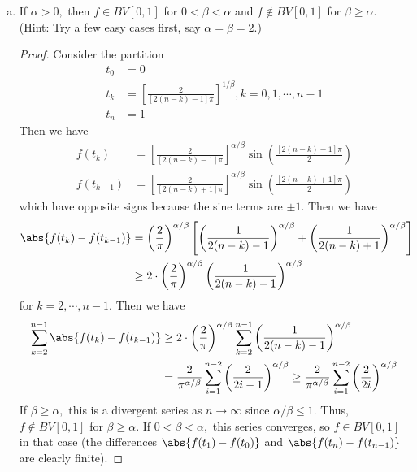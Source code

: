 \documentclass{article}
\begin{document}
\begin{itemize}
\begin{enumerate}[(a)]
			\item If $\alpha>0,$ then $f\in BV[0, 1]$ for $0<\beta<\alpha$ and $f\not\in BV[0, 1]$ for $\beta\ge \alpha.$ (Hint: Try a few easy cases first, say $\alpha=\beta=2.$)
				\begin{proof}
					Consider the partition
					\begin{align*}
						t_0 &= 0 \\
						t_k &= \left[ \frac{2}{[2(n-k)-1]\pi} \right]^{1/\beta}, k=0, 1, \cdots, n-1 \\
						t_n &= 1
					\end{align*}
					Then we have
					\begin{align*}
						f(t_k) &= \left[ \frac{2}{[2(n-k)-1]\pi} \right]^{\alpha/\beta} \sin\left( \frac{[2(n-k)-1]\pi}{2} \right) \\
						f(t_{k-1}) &= \left[ \frac{2}{[2(n-k)+1]\pi} \right]^{\alpha/\beta}\sin\left( \frac{[2(n-k)+1]\pi}{2} \right)
					\end{align*}
					which have opposite signs because the sine terms are $\pm 1.$ Then we have
					\begin{align*}
						\abs{f(t_k)-f(t_{k-1})} &= \left( \frac{2}{\pi} \right)^{\alpha/\beta} \left[ \left( \frac{1}{2(n-k)-1} \right)^{\alpha/\beta} + \left( \frac{1}{2(n-k)+1} \right)^{\alpha/\beta} \right] \\
						&\ge 2\cdot \left( \frac{2}{\pi} \right)^{\alpha/\beta} \left( \frac{1}{2(n-k)-1} \right)^{\alpha/\beta}
					\end{align*}
					for $k=2, \cdots, n-1.$ Then we have
					\begin{align*}
						\sum_{k=2}^{n-1} \abs{f(t_k)-f(t_{k-1})} &\ge 2\cdot \left( \frac{2}{\pi} \right)^{\alpha/\beta} \sum_{k=2}^{n-1} \left( \frac{1}{2(n-k)-1} \right)^{\alpha/\beta} \\
						&= \frac{2}{\pi^{\alpha/\beta}} \sum_{i=1}^{n-2} \left( \frac{2}{2i-1} \right)^{\alpha/\beta} \ge \frac{2}{\pi^{\alpha/\beta}}\sum_{i=1}^{n-2} \left( \frac{2}{2i} \right)^{\alpha/\beta}
					\end{align*}
					If $\beta\ge\alpha,$ this is a divergent series as $n\to\infty$ since $\alpha/\beta\le1.$ Thus, $f\not\in BV[0, 1]$ for $\beta\ge \alpha.$ If $0<\beta<\alpha,$ this series converges, so $f\in BV[0, 1]$ in that case (the differences $\abs{f(t_1)-f(t_0)}$ and $\abs{f(t_n)-f(t_{n-1})}$ are clearly finite).
				\end{proof}

		\end{enumerate}


\end{itemize}
\end{document}
